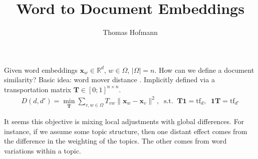 \documentclass{article}
\title{Word to Document Embeddings}
\author{Thomas Hofmann}
\renewcommand{\Re}{{\mathbb R}}
\newcommand{\x}{{\mathbf x}}
\begin{document}
\maketitle

Given word embeddings $\x_w \in \Re^d$, $w \in \Omega$, $|\Omega|=n$. How can we define a document similarity? Basic idea: word mover distance \cite{kusner2015word}. Implicitly defined via a transportation matrix $\mathbf T \in [0;1]^{n \times n}$. 
\begin{align}
D(d,d') = \min_{\mathbf T} \sum_{v,w \in \Omega} T_{vw} \| \x_w - \x_v\|^2, \;\; \text{s.t.}\;\;
\mathbf T \mathbf 1  = \text{tf}_d, \;\; \mathbf 1 \mathbf T = \text{tf}_{d'}
\end{align}

It seems this objective is mixing local adjustments with global differences. For instance, if we assume some topic structure, then one distant effect comes from the difference in the weighting of the topics. The other comes from word variations within a topic. 




\end{document}
